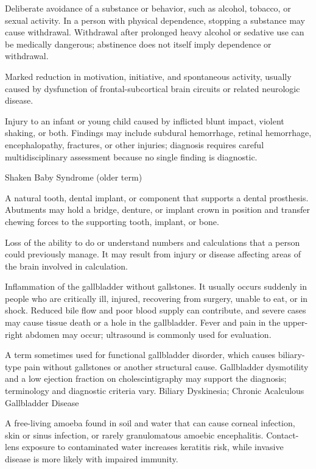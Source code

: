  Deliberate avoidance of a substance or behavior, such as alcohol, tobacco, or sexual activity.
In a person with physical dependence, stopping a substance may cause withdrawal. Withdrawal after prolonged
heavy alcohol or sedative use can be medically dangerous; abstinence does not itself imply dependence or withdrawal.

 Marked reduction in motivation, initiative, and spontaneous activity, usually caused by dysfunction of frontal-subcortical brain circuits or related neurologic disease.

 Injury to an infant or young child caused by inflicted blunt impact, violent shaking, or
both. Findings may include subdural hemorrhage, retinal hemorrhage, encephalopathy,
fractures, or other injuries; diagnosis requires careful multidisciplinary assessment
because no single finding is diagnostic.

\synonyms
Shaken Baby Syndrome (older term)

 A natural tooth, dental implant, or component that supports a dental prosthesis. Abutments may hold a bridge, denture, or implant crown in position and transfer chewing forces to the supporting tooth, implant, or bone.

 Loss of the ability to do or understand numbers and calculations that a person could previously manage. It may result from injury or disease affecting areas of the brain involved in calculation.

 Inflammation of the gallbladder without gallstones. It usually occurs suddenly in people who are critically ill, injured, recovering from surgery, unable to eat, or in shock. Reduced bile flow and poor blood supply can contribute, and severe cases may cause tissue death or a hole in the gallbladder. Fever and pain in the upper-right abdomen may occur; ultrasound is commonly used for evaluation.

 A term sometimes used for functional gallbladder disorder, which causes biliary-type pain without gallstones or another structural cause. Gallbladder dysmotility and a low ejection fraction on cholescintigraphy may support the diagnosis; terminology and diagnostic criteria vary.
\synonyms
Biliary Dyskinesia; Chronic Acalculous Gallbladder Disease

 A free-living amoeba found in soil and water that can cause corneal infection, skin or sinus infection, or rarely granulomatous amoebic encephalitis. Contact-lens exposure to contaminated water increases keratitis risk, while invasive disease is more likely with impaired immunity.

